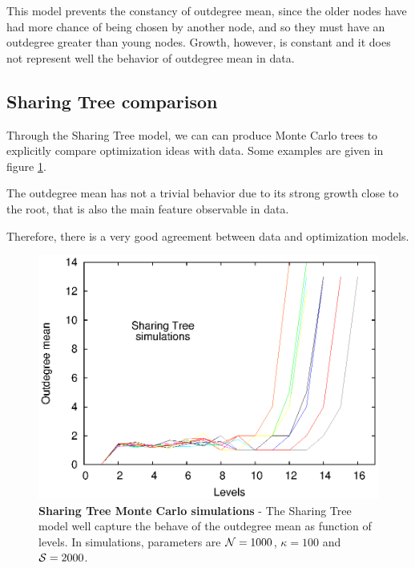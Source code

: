 This model prevents the constancy of outdegree mean, since the older nodes have had more chance of being chosen by another node, and so they must have an outdegree greater than young nodes. Growth, however, is constant and it does not represent well the behavior of outdegree mean in data.

\subsection{Sharing Tree comparison}
Through the Sharing Tree model, we can can produce Monte Carlo trees to explicitly compare optimization ideas with data. Some examples are given in figure \ref{STsim}.

The outdegree mean has not a trivial behavior due to its strong growth close to the root, that is also the main feature observable in data.

Therefore, there is a very good agreement between data and optimization models.

\begin{figure}[htp]%
\includegraphics[width=\textwidth,draft=false]{grafici/STsim.eps}
\caption{\label{STsim} \footnotesize\textbf{Sharing Tree Monte Carlo simulations} - The Sharing Tree model well capture the behave of the outdegree mean as function of levels. In simulations, parameters are $\mathcal N=1000$, $\kappa=100$ and $\mathcal S=2000$.}
\end{figure}

